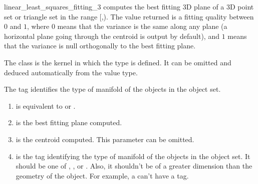 \begin{ccRefFunction}{linear_least_squares_fitting_3}
{ computes the best fitting 3D plane of a 3D point set or triangle set in the range
[,). The value returned is a fitting quality
between $0$ and $1$, where $0$ means that the variance is the same
along any plane (a horizontal plane going through the centroid is output
by default), and $1$ means that the variance is null orthogonally
to the best fitting plane. }

The class  is the kernel in which the type
 is defined. It can be omitted and
deduced automatically from the value type.

The tag  identifies the type of manifold of the objects in the object set.


\begin{enumerate}
   \item  {} is equivalent to  or .
   \item  {} is the best fitting plane computed.
   \item  {} is the centroid computed. This parameter can be
          omitted.
   \item  {} is the tag identifying the type of manifold of the objects in the object set. It should be one of , ,  or . Also, it shouldn't be of a greater dimension than the geometry of the object. For example, a  can't have a  tag.
\end{enumerate}

\end{ccRefFunction}
